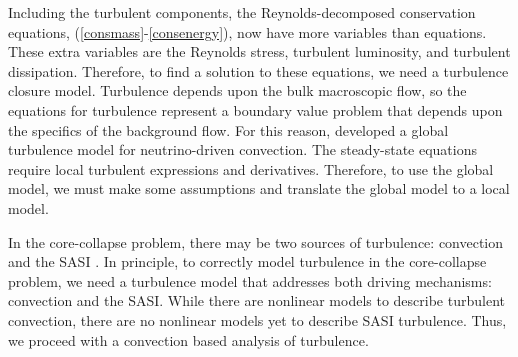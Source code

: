 \documentclass[twocolumn]{aastex6}
\begin{document}

Including the turbulent components, the Reynolds-decomposed conservation equations,
(\ref{consmass}-\ref{consenergy}), now have more variables than
equations. These extra variables are the
Reynolds stress, turbulent luminosity, and turbulent
dissipation.  Therefore, to find a solution to these equations, we need a
  turbulence closure model.  Turbulence depends upon the bulk
  macroscopic flow, so the equations for turbulence represent a
  boundary value problem that depends upon the specifics of the
  background flow.  For this reason, \citet{murphy13} developed a
  global turbulence model for neutrino-driven convection.  The
  steady-state equations require local turbulent expressions and
  derivatives.  Therefore, to use the global model, we must
  make some assumptions and translate the global model to a local model.

In the core-collapse problem, there may be two
sources of turbulence: convection and the SASI \citep{bethe90,blondin03}. In
  principle, to correctly model turbulence in the core-collapse
  problem, we need a turbulence model that addresses both driving
  mechanisms: convection and the SASI.  While there are nonlinear
  models to describe turbulent convection, there are no nonlinear models yet to
  describe SASI turbulence.  Thus, we proceed with a
convection based analysis of turbulence. 
\end{document}
